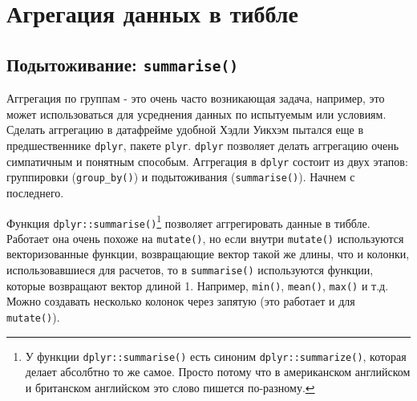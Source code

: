\documentclass[]{book}
\newenvironment{Shaded}{\begin{snugshade}}{\end{snugshade}}
\newcommand{\KeywordTok}[1]{\textcolor[rgb]{0.13,0.29,0.53}{\textbf{#1}}}
\newcommand{\DataTypeTok}[1]{\textcolor[rgb]{0.13,0.29,0.53}{#1}}
\newcommand{\DecValTok}[1]{\textcolor[rgb]{0.00,0.00,0.81}{#1}}
\newcommand{\StringTok}[1]{\textcolor[rgb]{0.31,0.60,0.02}{#1}}
\newcommand{\OtherTok}[1]{\textcolor[rgb]{0.56,0.35,0.01}{#1}}
\newcommand{\OperatorTok}[1]{\textcolor[rgb]{0.81,0.36,0.00}{\textbf{#1}}}
\newcommand{\NormalTok}[1]{#1}
\begin{document}
\section{Агрегация данных в тиббле}\label{tidy_aggregate}

\subsection{\texorpdfstring{Подытоживание:
\texttt{summarise()}}{Подытоживание: summarise()}}\label{summarise}

Аггрегация по группам - это очень часто возникающая задача, например,
это может использоваться для усреднения данных по испытуемым или
условиям. Сделать аггрегацию в датафрейме удобной Хэдли Уикхэм пытался
еще в предшественнике \texttt{dplyr}, пакете \texttt{plyr}.
\texttt{dplyr} позволяет делать аггрегацию очень симпатичным и понятным
способым. Аггрегация в \texttt{dplyr} состоит из двух этапов:
группировки (\texttt{group\_by()}) и подытоживания
(\texttt{summarise()}). Начнем с последнего.

Функция \texttt{dplyr::summarise()}\footnote{У функции
  \texttt{dplyr::summarise()} есть синоним \texttt{dplyr::summarize()},
  которая делает абсолбтно то же самое. Просто потому что в американском
  английском и британском английском это слово пишется по-разному.}
позволяет аггрегировать данные в тиббле. Работает она очень похоже на
\texttt{mutate()}, но если внутри \texttt{mutate()} используются
векторизованные функции, возвращающие вектор такой же длины, что и
колонки, использовавшиеся для расчетов, то в \texttt{summarise()}
используются функции, которые возвращают вектор длиной 1. Например,
\texttt{min()}, \texttt{mean()}, \texttt{max()} и т.д. Можно создавать
несколько колонок через запятую (это работает и для \texttt{mutate()}).

\begin{Shaded}
\end{Shaded}
\end{document}

